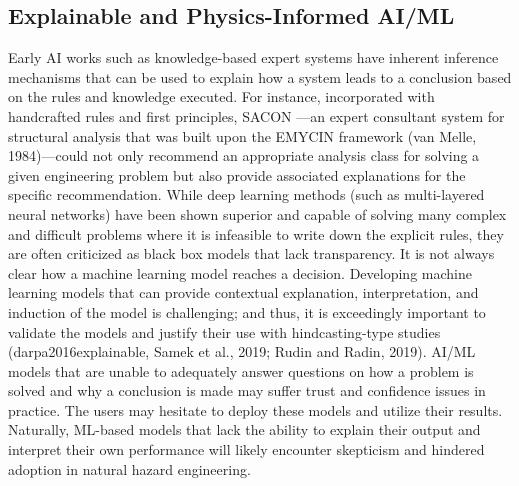 \subsection{Explainable and Physics-Informed AI/ML}

Early AI works such as knowledge-based expert systems have inherent inference mechanisms that can be used to explain how a system leads to a conclusion based on the rules and knowledge executed. For instance, incorporated with handcrafted rules and first principles, SACON \citep{bennett1978sacon}—an expert consultant system for structural analysis that was built upon the EMYCIN framework (van Melle, 1984)—could not only recommend an appropriate analysis class for solving a given engineering problem but also provide associated explanations for the specific recommendation. While deep learning methods (such as multi-layered neural networks) have been shown superior and capable of solving many complex and difficult problems where it is infeasible to write down the explicit rules, they are often criticized as black box models that lack transparency. It is not always clear how a machine learning model reaches a decision. Developing machine learning models that can provide contextual explanation, interpretation, and induction of the model is challenging; and thus, it is exceedingly important to validate the models and justify their use with hindcasting-type studies (darpa2016explainable, Samek et al., 2019; Rudin and Radin, 2019). AI/ML models that are unable to adequately answer questions on how a problem is solved and why a conclusion is made may suffer trust and confidence issues in practice. The users may hesitate to deploy these models and utilize their results. Naturally, ML-based models that lack the ability to explain their output and interpret their own performance will likely encounter skepticism and hindered adoption in natural hazard engineering. 

